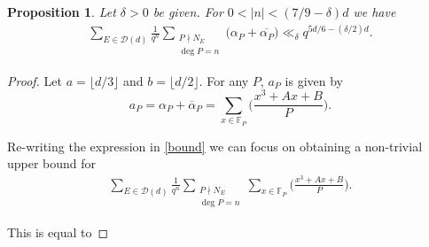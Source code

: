 \documentclass[12pt,reqno]{amsart}
\newcommand{\BF}{\mathbb{F}}
\newtheorem{prop}[lem]{Proposition}
\begin{document}
\begin{prop}\label{mainprop}
Let $\delta > 0$ be given. For $0 < |n| < (7 / 9 - \delta) d$ we have
\begin{align}\label{bound}
\sum_{E \in \mathcal{D}(d)} \frac{1}{q^n} \sum_{\substack{P \nmid N_E \\ \deg P = n}} \Big (\alpha_P + \overline{\alpha_P} \Big )  \ll_{\delta} q^{5 d / 6 - (\delta / 2) d}.
\end{align}
\end{prop}
\begin{proof}
Let $a = \lfloor d / 3 \rfloor$ and $b = \lfloor d / 2 \rfloor$.
For any $P$, $a_{P}$ is given by
$$
a_{P}= \alpha_{P} + \overline{\alpha}_{P} = \sum_{x \in \BF_{P}} \Big ( \frac{x^3+Ax+B}{P} \Big ). 
$$

Re-writing the expression in \eqref{bound} we can focus on obtaining a non-trivial upper bound for
\begin{align*}
\sum_{E \in \mathcal{D}(d)} \frac{1}{q^n} \sum_{\substack{P \nmid N_E \\ \deg P = n}} \sum_{x \in \BF_{P}}  \Big (\frac{x^3+Ax+B}{P} \Big ).
\end{align*}

This is equal to


\end{proof}
\end{document}
